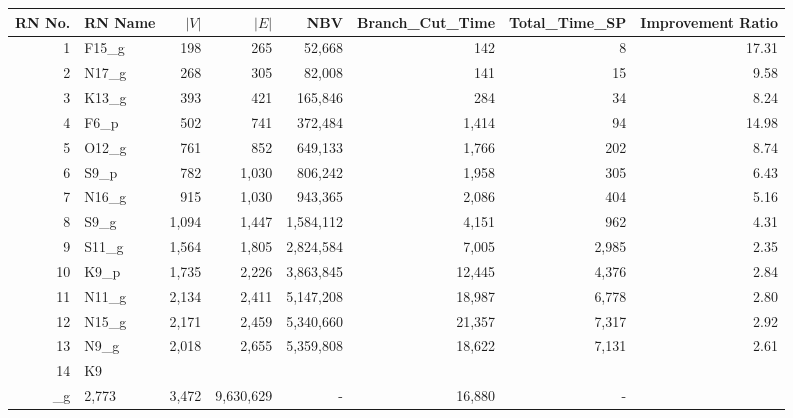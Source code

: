 \begin{tabular}{rlrrrrrr}
\toprule
 RN No. & RN Name & $|V|$ & $|E|$ &       NBV & Branch_Cut_Time & Total_Time_SP & Improvement Ratio \\
\midrule
      1 &  F15\_g &   198 &   265 &    52,668 &             142 &             8 &             17.31 \\
      2 &  N17\_g &   268 &   305 &    82,008 &             141 &            15 &              9.58 \\
      3 &  K13\_g &   393 &   421 &   165,846 &             284 &            34 &              8.24 \\
      4 &   F6\_p &   502 &   741 &   372,484 &           1,414 &            94 &             14.98 \\
      5 &  O12\_g &   761 &   852 &   649,133 &           1,766 &           202 &              8.74 \\
      6 &   S9\_p &   782 & 1,030 &   806,242 &           1,958 &           305 &              6.43 \\
      7 &  N16\_g &   915 & 1,030 &   943,365 &           2,086 &           404 &              5.16 \\
      8 &   S9\_g & 1,094 & 1,447 & 1,584,112 &           4,151 &           962 &              4.31 \\
      9 &  S11\_g & 1,564 & 1,805 & 2,824,584 &           7,005 &         2,985 &              2.35 \\
     10 &   K9\_p & 1,735 & 2,226 & 3,863,845 &          12,445 &         4,376 &              2.84 \\
     11 &  N11\_g & 2,134 & 2,411 & 5,147,208 &          18,987 &         6,778 &              2.80 \\
     12 &  N15\_g & 2,171 & 2,459 & 5,340,660 &          21,357 &         7,317 &              2.92 \\
     13 &   N9\_g & 2,018 & 2,655 & 5,359,808 &          18,622 &         7,131 &              2.61 \\
     14 &  K9\\_g & 2,773 & 3,472 & 9,630,629 &               - &        16,880 &                 - \\
\bottomrule
\end{tabular}
